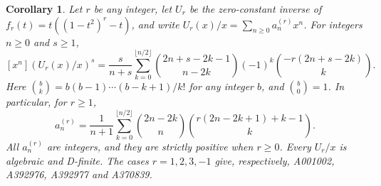 \documentclass[10pt]{article}
\newtheorem{corollary}[theorem]{Corollary}
\begin{document}
\begin{corollary}\label{cor:family}
Let $r$ be any integer, let $U_r$ be the zero-constant inverse of
$f_r(t)=t((1-t^2)^r-t)$, and write $U_r(x)/x=\sum_{n\geq0}a_n^{(r)}x^n$.
For integers $n\geq0$ and $s\geq1$,
\begin{equation}\label{eq:powers}
 [x^n](U_r(x)/x)^s=\frac{s}{n+s}
 \sum_{k=0}^{\lfloor n/2\rfloor}
 \binom{2n+s-2k-1}{n-2k}
 (-1)^k\binom{-r(2n+s-2k)}{k}.
\end{equation}
Here $\binom{b}{k}=b(b-1)\cdots(b-k+1)/k!$ for any integer $b$,
and $\binom{b}{0}=1$. In particular, for $r\geq1$,
\begin{equation}\label{eq:family}
 a_n^{(r)}=\frac{1}{n+1}\sum_{k=0}^{\lfloor n/2\rfloor}
 \binom{2n-2k}{n}\binom{r(2n-2k+1)+k-1}{k}.
\end{equation}
All $a_n^{(r)}$ are integers, and they are strictly positive when $r\geq0$.
Every $U_r/x$ is algebraic and D-finite. The cases $r=1,2,3,-1$ give,
respectively, A001002, A392976, A392977 and A370839.
\end{corollary}
\end{document}
